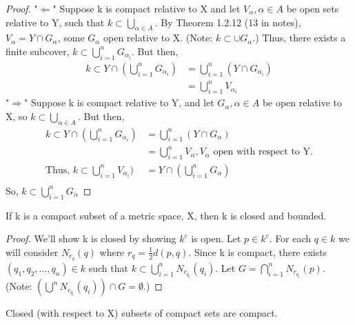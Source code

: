 \documentclass[11pt,fleqn]{book} %
\begin{document}
\begin{proof}
	"\underline{$\Leftarrow$}" Suppose k is compact relative to X and let $V_\alpha, \alpha \in A$ be open sets relative to Y, such that $k \subset \bigcup\limits_{\alpha \in A}$. By Theorem 1.2.12 (13 in notes), $V_\alpha = Y\cap G_\alpha$, some $G_\alpha$ open relative to X. (Note: $k \subset \cup G_\alpha$.) Thus, there exists a finite subcover, $k \subset \bigcup\limits^n_{i=1} G_{\alpha_i}$. But then, 
		\begin{align*}
			k \subset Y \cap (\bigcup\limits^n_{i=1} G_{\alpha_i}) &= \bigcup\limits^n_{i=1}(Y \cap G_{\alpha_i})\\
			&= \bigcup\limits^n_{i=1} V_{\alpha_i}
		\end{align*}
	"\underline{$\Rightarrow$}" Suppose k is compact relative to Y, and let $G_\alpha, \alpha \in A$ be open relative to X, so $k \subset \bigcup\limits_{\alpha \in A}$. But then,
		\begin{align*}
		 	k \subset Y \cap (\bigcup\limits^n_{i=1} G_{\alpha_i}) &= \bigcup\limits^n_{i=1}(Y \cap G_{\alpha})\\
			&= \bigcup\limits^n_{i=1} V_{\alpha}, V_\alpha \text{ open with respect to Y.}\\
			\text{Thus, } k \subset \bigcup\limits^n_{i=1} V_{\alpha_i}) &= Y \cap (\bigcup\limits^n_{i=1} G_{\alpha})\\
		 \end{align*}
		 So, $k \subset \bigcup\limits^n_{i=1} G_{\alpha}$ 
\end{proof}

\begin{theorem}
	If k is a compact subset of a metric space, X, then k is closed and bounded.
\end{theorem}

\begin{proof}
	We'll show k is closed by showing $k^c$ is open. Let $p \in k^c$. For each $q \in k$ we will consider $N_{r_q}(q)$ where $r_q = \frac{1}{2} d(p,q)$. Since k is compact, there exists $(q_1, q_2, \dots, q_n) \in k$ such that $k \subset \bigcup\limits^n_{i=1} N_{r_{q_i}}(q_i)$. Let $G = \bigcap\limits^n_{i=1} N_{r_{q_i}}(p)$. (Note: $(\bigcup\limits^n N_{r_{q_i}}(q_i))\cap G = \emptyset$.)
\end{proof}

\begin{theorem}
	Closed (with respect to X) subsets of compact sets are compact.
\end{theorem}
\end{document}
